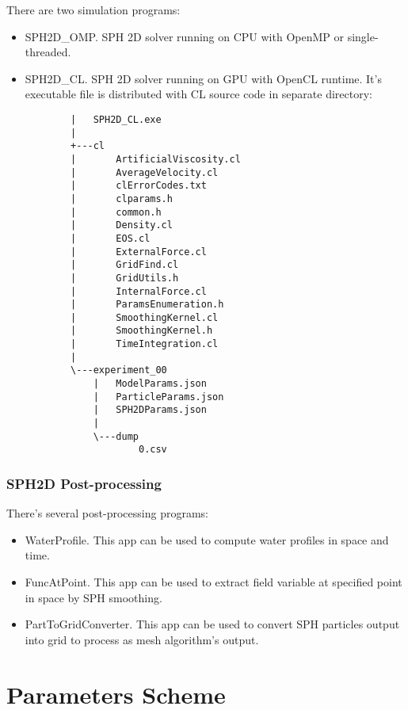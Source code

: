 \documentclass{article}
\begin{document}
There are two simulation programs:
\begin{itemize}
    \item SPH2D\_OMP. SPH 2D solver running on CPU with OpenMP or single-threaded.
    \item SPH2D\_CL. SPH 2D solver running on GPU with OpenCL runtime. It's executable file is distributed with CL source code in separate directory:

    \begin{verbatim}
        |   SPH2D_CL.exe
        |
        +---cl
        |       ArtificialViscosity.cl
        |       AverageVelocity.cl
        |       clErrorCodes.txt
        |       clparams.h
        |       common.h
        |       Density.cl
        |       EOS.cl
        |       ExternalForce.cl
        |       GridFind.cl
        |       GridUtils.h
        |       InternalForce.cl
        |       ParamsEnumeration.h
        |       SmoothingKernel.cl
        |       SmoothingKernel.h
        |       TimeIntegration.cl
        |   
        \---experiment_00
            |   ModelParams.json
            |   ParticleParams.json
            |   SPH2DParams.json
            |   
            \---dump
                    0.csv
    \end{verbatim}
\end{itemize}

\subsubsection{SPH2D Post-processing}

There's several post-processing programs:
\begin{itemize}
    \item WaterProfile. This app can be used to compute water profiles in space and time.
    \item FuncAtPoint. This app can be used to extract field variable at specified point in space by SPH smoothing.
    \item PartToGridConverter. This app can be used to convert SPH particles output into grid to process as mesh algorithm's output.
\end{itemize}

\section{Parameters Scheme}





\end{document}
